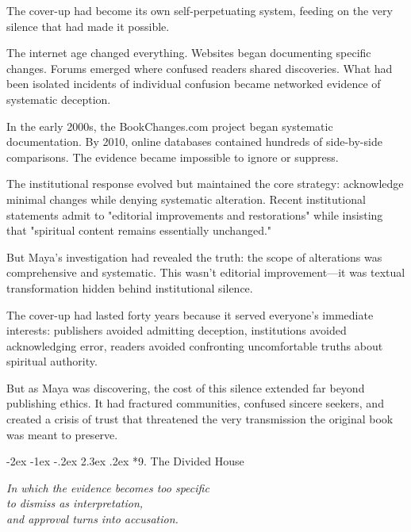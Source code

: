 \documentclass[12pt,twoside]{book}
\makeatletter
\def\cleardoublepage{\clearpage\if@twoside \ifodd\c@page\else\hbox{}\thispagestyle{empty}\newpage\if@twocolumn\hbox{}\newpage\fi\fi\fi}
\renewcommand\section{\@startsection{section}{1}{\z@}%
{-2ex \@plus -1ex \@minus -.2ex}%
{2.3ex \@plus.2ex}%
{\normalfont\Large\bfseries}}
\makeatother
\begin{document}
The cover-up had become its own self-perpetuating system, feeding on the very silence that had made it possible.

The internet age changed everything. Websites began documenting specific changes. Forums emerged where confused readers shared discoveries. What had been isolated incidents of individual confusion became networked evidence of systematic deception.

In the early 2000s, the BookChanges.com project began systematic documentation. By 2010, online databases contained hundreds of side-by-side comparisons. The evidence became impossible to ignore or suppress.

The institutional response evolved but maintained the core strategy: acknowledge minimal changes while denying systematic alteration. Recent institutional statements admit to "editorial improvements and restorations" while insisting that "spiritual content remains essentially unchanged."

But Maya's investigation had revealed the truth: the scope of alterations was comprehensive and systematic. This wasn't editorial improvement—it was textual transformation hidden behind institutional silence.

The cover-up had lasted forty years because it served everyone's immediate interests: publishers avoided admitting deception, institutions avoided acknowledging error, readers avoided confronting uncomfortable truths about spiritual authority.

But as Maya was discovering, the cost of this silence extended far beyond publishing ethics. It had fractured communities, confused sincere seekers, and created a crisis of trust that threatened the very transmission the original book was meant to preserve.

\cleardoublepage
\vspace*{0.20\textheight}
\section*{9. The Divided House}
\thispagestyle{chapterpage}

{\centering\itshape In which the evidence becomes too specific\\to dismiss as interpretation,\\and approval turns into accusation.\par}
\vspace{0.3cm}
\end{document}
